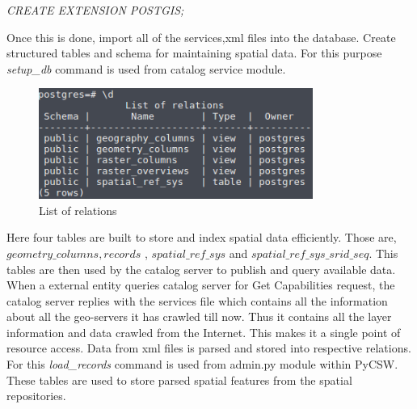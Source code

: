 \begin{center}
\textit{CREATE EXTENSION POSTGIS;}
\end{center}

\par Once this is done, import all of the services,xml files into the database. Create structured tables and schema for maintaining spatial data. For this purpose \textit{setup\_db} command is used from catalog service module.

\begin{figure}[h]
\centering
  \includegraphics[width=0.8\textwidth]{8}
  \caption{List of relations}
\end{figure}

\par Here four tables are built to store and index spatial data efficiently. Those are, $geometry\_columns, records$ , $spatial\_ref\_sys$ and $spatial\_ref\_sys\_srid\_seq$. This tables are then used by the catalog server to publish and query available data. When a external entity queries catalog server for Get Capabilities request, the catalog server replies with the services file which contains all the information about all the geo-servers it has crawled till now. Thus it contains all the layer information and data crawled from the Internet. This makes it a single point of resource access. Data from xml files is parsed and stored into respective relations. For this \textit{load\_records} command is used from admin.py module within PyCSW. These tables are used to store parsed spatial features from the spatial repositories.

